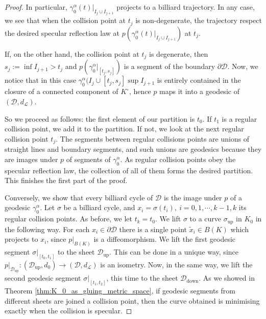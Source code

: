 \documentclass[10pt,a4paper]{amsart}
\begin{document}
\begin{proof}
    In particular, \( \gamma^\alpha_0(t)\rvert_{I_j \cup I_{j+1}} \) projects to a billiard trajectory.
    In any case, we see that when the collision point at \(t_j\) is non-degenerate, the trajectory respect the desired specular reflection law at \( p(\gamma^\alpha_0(t)\rvert_{I_j \cup I_{j+1}}) \) at \(t_j\).
    \par If, on the other hand, the collision point at \(t_j\) is degenerate, then \(s_{j}:=\inf I_{j+1} > t_j \) and \(p(\gamma^\alpha_0\rvert_{[t_j, s_j]})\) is a segment of the boundary \( \partial \mathcal{D} \). 
    Now, we notice that in this case \(\gamma^\alpha_0(I_j \cup [t_j, s_j] \sup I_{j+1}\) is entirely contained in the closure of a connected component of \( K^\circ \), hence  \(p\) maps it into a geodesic of \( (\mathcal{D}, d_\mathcal{L}). \)   
    \par So we proceed as follows: the first element of our partition is \( t_0 \). 
    If \( t_1 \) is a regular collision point, we add it to the partition.
    If not, we look at the next regular collision point \( t_j \). 
    The segments between regular collisions points are unions of straight lines and boundary segments, and such unions are geodesics because they are images under \( p \) of segments of \( \gamma^\alpha_0 \). 
    As regular collision points obey the specular reflection law, the collection of all of them forms the desired partition.  
    This finishes the first part of the proof.
    \par Conversely, we show that every billiard cycle of \( \mathcal{D} \) is the image under \( p\) of a geodesic \( \gamma^\alpha_0 \).
    Let \( \sigma \) be a billiard cycle, and \( x_i = \sigma(t_i), \ i = 0, 1, \cdots, k-1, k \) its regular collision points.
    As before, we let \( t_k = t_0 \).
    We lift \( \sigma \) to a curve \( \sigma_\mathrm{up} \) in \( K_0 \) in the following way.
    For each \( x_i \in \partial\mathcal{D}\) there is a single point \( \widetilde x_i \in B(K) \) which projects to \( x_i \), since \( p\rvert_{B(K)} \) is a diffeomorphism.
    We lift the first geodesic segment \( \sigma\rvert_{[t_0, t_1]} \) to the sheet \( \mathcal{D}_\mathrm{up} \).
    This can be done in a unique way, since \( p\rvert_{\mathcal{D}_\mathrm{up}}: (\mathcal{D}_\mathrm{up}, d_0) \to (\mathcal{D}, d_\mathcal{L}) \) is an isometry.
    Now, in the same way, we lift the second geodesic segment \( \sigma\rvert_{[t_1, t_2]} \), this time to the sheet \( \mathcal{D}_\mathrm{down} \).
    As we showed in Theorem \ref{thm:K_0_as_gluing_metric_space}, if geodesic segments from different sheets are joined a collision point, then the curve obtained is minimising exactly when the collision is specular.

\end{proof}
\end{document}
